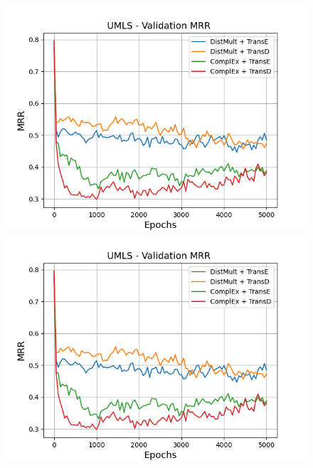 \begin{figure}
    \centering
    \begin{minipage}{.45\textwidth}
      \centering
      \includegraphics[width=0.9\linewidth]{figures/results/gan_train/pretrained/uncertainty/max/entropy/umls/5k_epochs/uncertainty_umls_mrrs.png}
    \end{minipage}%
    \begin{minipage}{.45\textwidth}
      \centering
      \includegraphics[width=0.9\linewidth]{figures/results/gan_train/pretrained/uncertainty/max/entropy/umls/5k_epochs/uncertainty_umls_mrrs.png}
    \end{minipage}
    

\end{figure}
